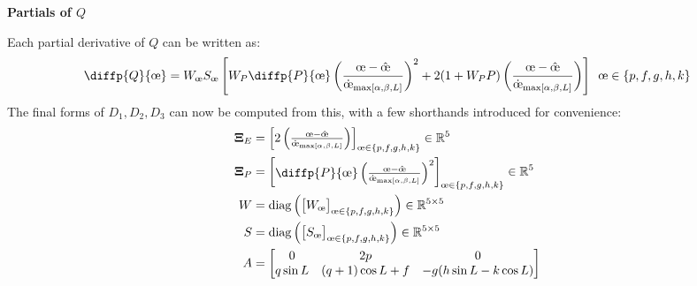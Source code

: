 \textbf{Partials of \(Q\)}

Each partial derivative of \(Q\) can be written as:
\begin{equation*}
  \diffp{Q}{{\moe}} = W_{\moe} S_{\moe} \left[ W_P\diffp{P}{{\moe}}\left(\frac{\moe - \hat{\moe}}{\dot{\moe}_{\maxrocall}} \right)^2 + 2 (1+W_P P) \left(\frac{\moe - \hat{\moe}}{\dot{\moe}_{\maxrocall}} \right) \right] \ \, \moe \in \{p, f, g, h, k\}
\end{equation*}
The final forms of \(D_1, D_2, D_3\) can now be computed from this, with a few shorthands introduced for convenience:
\begin{align*}
  \boldsymbol{\Xi}_E & = \begin{bmatrix}
                           2  \left(\frac{\moe - \hat{\moe}}{\dot{\moe}_{\maxrocall}} \right)
                         \end{bmatrix}_{\moe \in \{p, f, g, h, k\}} \in \mathbb{R}^5                                                 \\
  \boldsymbol{\Xi}_P & = \begin{bmatrix}
                           \diffp{P}{{\moe}}\left(\frac{\moe - \hat{\moe}}{\dot{\moe}_{\maxrocall}} \right)^2
                         \end{bmatrix}_{\moe \in \{p, f, g, h, k\}} \in \mathbb{R}^5 \\
  W                  & = \mathrm{diag} \left(\begin{bmatrix}
                                               W_{\moe}
                                             \end{bmatrix}_{\moe \in \{p, f, g, h, k\}} \right) \in \mathbb{R}^{5 \times 5}                                                                                              \\
  S                  & = \mathrm{diag} \left(\begin{bmatrix}
                                               S_{\moe}
                                             \end{bmatrix}_{\moe \in \{p, f, g, h, k\}}\right)  \in \mathbb{R}^{5 \times 5}                                                                                              \\
  A                  & =
  \begin{bmatrix}
    0        & 2p               & 0                                 \\
    q\sin L  & (q+1) \cos L + f & -g(h \sin L - k \cos L)           \\

\end{bmatrix}
\end{align*}
